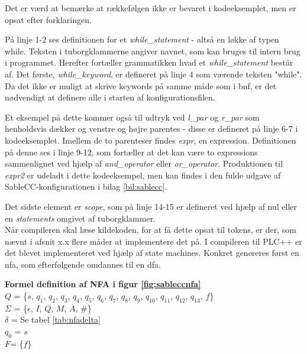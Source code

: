 \noindent Det er værd at bemærke at rækkefølgen ikke er bevaret i kodeeksemplet, men er opsat efter forklaringen.

På linje 1-2 ses definitionen for et \textit{while\_statement} - altså en løkke af typen while. Teksten i tuborgklammerne angiver navnet, som kan bruges til intern brug i programmet. Herefter fortæller grammatikken hvad et \textit{while\_statement} består af. Det første, \textit{while\_keyword}, er defineret på linje 4 som værende teksten "while"\mbox{}. Da det ikke er muligt at skrive keywords på samme måde som i \gls{bnf}, er det nødvendigt at definere alle i starten af konfigurationsfilen.

Et eksempel på dette kommer også til udtryk ved \textit{l\_par} og \textit{r\_par} som henholdsvis dækker og venstre og højre parentes - disse er defineret på linje 6-7 i kodeeksemplet. Imellem de to parenteser findes \textit{expr}, en expression. Definitionen på denne ses i linje 9-12, som fortæller at det kan være to expressions sammenlignet ved hjælp af \textit{and\_operator} eller \textit{or\_operator}. Produktionen til \textit{expr2} er udeladt i dette kodeeksempel, men kan findes i den fulde udgave af SableCC-konfigurationen i bilag \ref{bil:sablecc}.

Det sidste element er \textit{scope}, som på linje 14-15 er defineret ved hjælp af nul eller en \textit{statements} omgivet af tuborgklammer.\\

\noindent Når compileren skal læse kildekoden, for at få dette opsat til tokens, er der, som nævnt i afsnit x.x flere måder at implementere det på. I compileren til PLC++ er det blevet implementeret ved hjælp af state machines. Konkret genereres først en \gls{nfa}, som efterfølgende omdannes til en \gls{dfa}.


\noindent \textbf{Formel definition af NFA i figur \ref{fig:sableccnfa}}\\
\noindent $Q$ = \{$s$, $q_1$, $q_2$, $q_3$, $q_4$, $q_5$, $q_6$, $q_7$, $q_8$, $q_9$, $q_{10}$, $q_{11}$, $q_{12}$, $q_{13}$, $f$\}\\
\noindent $\Sigma$ = \{$\epsilon$, $I$, $Q$, $M$, $A$, $\#$\}\\
\noindent $\delta$ = Se tabel \ref{tab:nfadelta}\\
\noindent $q_0$ = $s$\\
\noindent $F$= \{$f$\}\\

